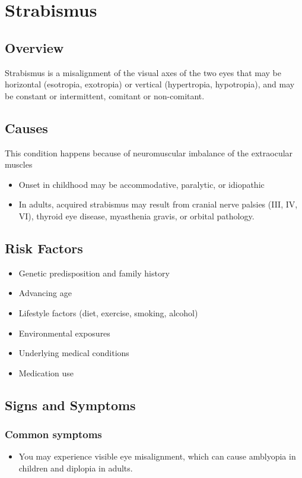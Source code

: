 \chapter{Strabismus}
\label{sec:Strabismus}

\section{Overview}
Strabismus is a misalignment of the visual axes of the two eyes that may be horizontal (esotropia, exotropia) or vertical (hypertropia, hypotropia), and may be constant or intermittent, comitant or non-comitant.
\section{Causes}
This condition happens because of neuromuscular imbalance of the extraocular muscles

\begin{itemize}[noitemsep]
  \item Onset in childhood may be accommodative, paralytic, or idiopathic
  \item In adults, acquired strabismus may result from cranial nerve palsies (III, IV, VI), thyroid eye disease, myasthenia gravis, or orbital pathology.
\end{itemize}
\section{Risk Factors}


\begin{itemize}[noitemsep]
  \item Genetic predisposition and family history
  \item Advancing age
  \item Lifestyle factors (diet, exercise, smoking, alcohol)
  \item Environmental exposures
  \item Underlying medical conditions
  \item Medication use
\end{itemize}
\section{Signs and Symptoms}

\subsection{Common symptoms}
\begin{itemize}[noitemsep]
  \item You may experience visible eye misalignment, which can cause amblyopia in children and diplopia in adults. 
  \end{itemize}

